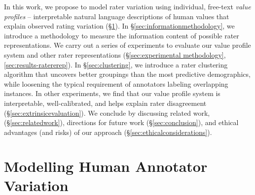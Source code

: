 \documentclass[11pt]{article}
\begin{document}
In this work, we propose to model rater variation using individual, free-text {\em value profiles} -- interpretable natural language descriptions of human values that explain observed rating variation (\S \ref{sec:modellingvariation}).
In \S \ref{sec:informationmethodology}, we introduce a methodology to measure the information content of possible rater representations.
We carry out a series of experiments to evaluate our value profile system and other rater representations (\S \ref{sec:experimental methodology}, \ref{sec:results-ratererep}).
In \S \ref{sec:clustering}, we introduce a rater clustering algorithm that uncovers better groupings than the most predictive demographics, while loosening the typical requirement of annotators labeling overlapping instances.
In other experiments, we find that our value profile system is interpretable, well-calibrated, and helps explain rater disagreement (\S \ref{sec:extrinsicevaluation}).
We conclude by discussing related work, (\S \ref{sec:relatedwork}), directions for future work (\S \ref{sec:conclusion}), and ethical advantages (and risks) of our approach (\S \ref{sec:ethicalconsiderations}).


\section{Modelling Human Annotator Variation}
\label{sec:modellingvariation}
\end{document}
